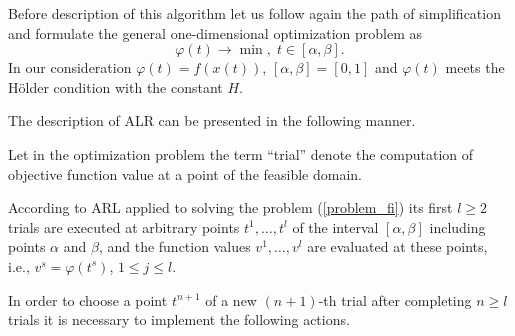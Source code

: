\documentclass[runningheads]{llncs}
\begin{document}
Before description of this algorithm let us follow again the path of simplification and formulate the general one-dimensional optimization problem as
\begin{equation}\label{problem_fi}
\varphi(t) \rightarrow \min, \; t \in [\alpha,\beta].
\end{equation}
In our consideration $\varphi(t) = f(x(t))$, $[\alpha,\beta] = [0,1]$ and $\varphi(t)$  meets the H{\"o}lder condition with the constant $H$.

The description of ALR can be presented in the following manner.

Let in the optimization problem the term ``trial'' denote the computation of objective function value at a point of the feasible domain. 


According to ARL applied to solving the problem (\ref{problem_fi}) its first $l \geq 2$  trials are executed at arbitrary points $t^1, \dots, t^l$ of the interval $[\alpha, \beta]$ including points $\alpha$ and $\beta$, and the function values $v^1, \dots, v^l$ are evaluated at these points, i.e., $v^s=\varphi(t^s)$, $1 \leq j \leq l$.

In order to choose a point $t^{n+1}$ of a new $(n+1)$-th trial after completing $n \geq l$ trials it is necessary to implement the following actions.
\end{document}
